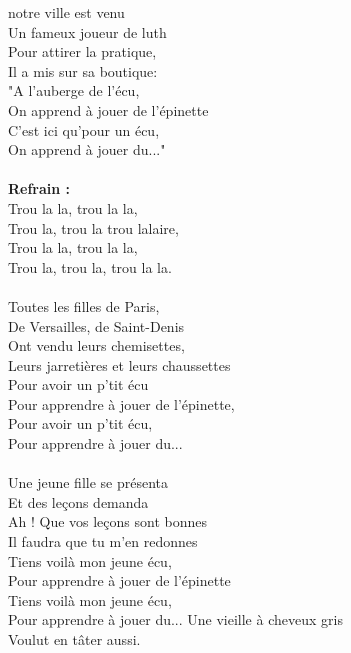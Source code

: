 %
 notre ville est venu ~~~~~~~ \bissimple
\\Un fameux joueur de luth ~~ \bissimple
\\Pour attirer la pratique,
\\Il a mis sur sa boutique:
\\"A l'auberge de l'écu,
\\On apprend à jouer de l'épinette
\\C'est ici qu'pour un écu,
\\On apprend à jouer du..."
\\\\\textbf{Refrain :}
\\Trou la la, trou la la,
\\Trou la, trou la trou lalaire,
\\Trou la la, trou la la,
\\Trou la, trou la, trou la la.
\\\\Toutes les filles de Paris, ~~~~~~~ \bissimple
\\De Versailles, de Saint-Denis ~~ \bissimple
\\Ont vendu leurs chemisettes,
\\Leurs jarretières et leurs chaussettes
\\Pour avoir un p'tit écu
\\Pour apprendre à jouer de l'épinette,
\\Pour avoir un p'tit écu,
\\Pour apprendre à jouer du...
\\\\Une jeune fille se présenta ~~ \bissimple
\\Et des leçons demanda ~~~~~~ \bissimple
\\Ah ! Que vos leçons sont bonnes
\\Il faudra que tu m'en redonnes
\\Tiens voilà mon jeune écu,
\\Pour apprendre à jouer de l'épinette
\\Tiens voilà mon jeune écu,
\\Pour apprendre à jouer du...
\breakpage
Une vieille à cheveux gris ~~ \bissimple
\\Voulut en tâter aussi. ~~~~~~~ \bissimple
